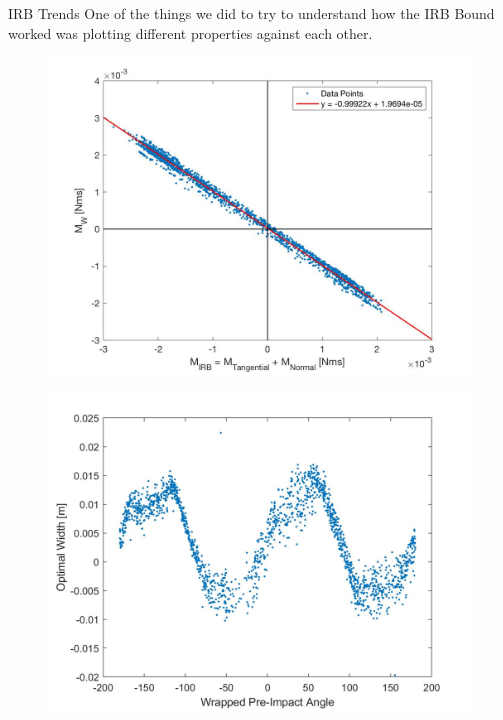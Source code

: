 \begin{frame}{IRB Trends}
One of the things we did to try to understand how the IRB Bound worked was plotting different properties against each other. 


\begin{figure}
    \centering
    \begin{minipage}{.5\textwidth}
      \centering
      \includegraphics[width=1\linewidth]{figures/MomentProp2.jpg}
      \label{fig:contourWM2}
    \end{minipage}%
    \begin{minipage}{.5\textwidth}
      \centering
      \includegraphics[width=1\linewidth]{figures/ellipseAngleWidth.jpg}
      \label{fig:histWM2}
    \end{minipage}
\end{figure}    
    
\end{frame}